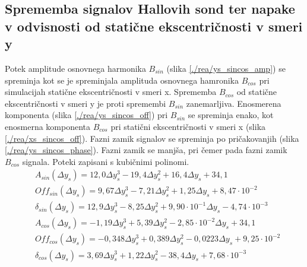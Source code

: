 \subsection{Sprememba signalov Hallovih sond ter napake v odvisnosti od statične ekscentričnosti v smeri y}
Potek amplitude osnovnega harmonika $B_{sin}$ (slika \ref{./rea/ys_sincos_amp}) se spreminja kot se je spreminjala amplituda osnovnega hamronika $B_{cos}$ pri simulacijah statične ekscentričnosti v smeri x. Sprememba $B_{cos}$ od statične ekscentričnosti v smeri y je proti spremembi $B_{sin}$ zanemarljiva. Enosmerena komponenta (slika \ref{./rea/ys_sincos_off}) pri $B_{sin}$ se spreminja enako, kot enosmerna komponenta $B_{cos}$ pri statični ekscentričnosti v smeri x (slika \ref{./rea/xs_sincos_off}).  Fazni zamik signalov se spreminja po pričakovanjih (slika \ref{./rea/ys_sincos_phase}). Fazni zamik se manjša, pri čemer pada fazni zamik $B_{cos}$ signala.
Poteki zapisani s kubičnimi polinomi.
\begin{eqnarray}
&A_{sin}( \Delta y_s) = 12,0 \Delta y_s^3-19,4\Delta y_s^2+16,4\Delta y_s+34,1            \\       
&Off_{sin} ( \Delta y_s)= 9,67            \Delta y_s^3-7,21\Delta y_s^2+1,25\Delta y_s+8,47\cdot 10^{-2}            \\    
&\delta_{sin}( \Delta y_s) = 12,9 \Delta y_s^3-8,25            \Delta y_s^2+9,90\cdot 10^{-1}\Delta y_s-4,74\cdot 10^{-3}            \\
&A_{cos}( \Delta y_s) = -1,19            \Delta y_s^3+5,39\Delta y_s^2-2,85\cdot 10^{-2}\Delta y_s+34,1              \\      
&Off_{cos} ( \Delta y_s)= -0,348\Delta y_s^3+0,389\Delta y_s^2-0,0223\Delta y_s+9,25\cdot 10^{-2}            \\ 
&\delta_{cos}( \Delta y_s) = 3,69            \Delta y_s^3+1,22\Delta y_s^2-38,4    \Delta y_s+7,68\cdot 10^{-3} 
\end{eqnarray}

